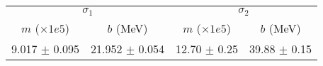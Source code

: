 \begin{tabular}{cc|cc}
\multicolumn{2}{c|}{$\sigma_1$} & \multicolumn{2}{|c}{$\sigma_2$} \\
$m$ ($\times1e5$) & $b$ (MeV) & $m$ ($\times1e5$) & $b$ (MeV) \\
\hline
9.017 $\pm$ 0.095 & 21.952 $\pm$ 0.054 & 12.70 $\pm$ 0.25 & 39.88 $\pm$ 0.15\\
\end{tabular}
